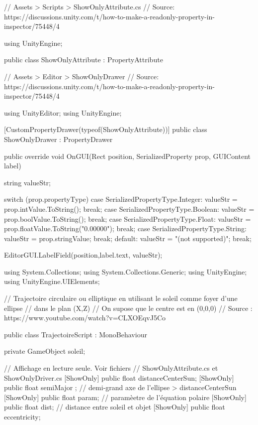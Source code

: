 \documentclass[a4paper,10pt]{article}
\newenvironment{solution}%
{\begin{tcolorbox}[breakable,colback=red!5!white,colframe=red!75!black,title=Solution]}%
{\end{tcolorbox}}
\newenvironment{boxcode}%
{\begin{tcolorbox}[breakable,colback=gray!5!white,colframe=black]}%
	{\end{tcolorbox}}
\begin{document}
\begin{solution}
\begin{boxcode}
	\begin{csharpsansbord}
// Assets > Scripts > ShowOnlyAttribute.cs
// Source: https://discussions.unity.com/t/how-to-make-a-readonly-property-in-inspector/75448/4
	
using UnityEngine;

public class ShowOnlyAttribute : PropertyAttribute
{
	
}
	\end{csharpsansbord}
\end{boxcode}


\begin{boxcode}
	\begin{csharpsansbord}
// Assets > Editor > ShowOnlyDrawer
// Source: https://discussions.unity.com/t/how-to-make-a-readonly-property-in-inspector/75448/4

using UnityEditor;
using UnityEngine;

[CustomPropertyDrawer(typeof(ShowOnlyAttribute))]
public class ShowOnlyDrawer : PropertyDrawer
{
	public override void OnGUI(Rect position, SerializedProperty prop, GUIContent label)
	{
		string valueStr;
		
		switch (prop.propertyType)
		{
			case SerializedPropertyType.Integer:
			valueStr = prop.intValue.ToString();
			break;
			case SerializedPropertyType.Boolean:
			valueStr = prop.boolValue.ToString();
			break;
			case SerializedPropertyType.Float:
			valueStr = prop.floatValue.ToString("0.00000");
			break;
			case SerializedPropertyType.String:
			valueStr = prop.stringValue;
			break;
			default:
			valueStr = "(not supported)";
			break;
		}
		
		EditorGUI.LabelField(position,label.text, valueStr);
	}
}	
	\end{csharpsansbord}
\end{boxcode}


\begin{boxcode}
	\begin{csharpsansbord}
using System.Collections;
using System.Collections.Generic;
using UnityEngine;
using UnityEngine.UIElements;

// Trajectoire circulaire ou elliptique en utilisant le soleil comme foyer d'une ellipse
//  dans le plan (X,Z)
// On supose que le centre est en (0,0,0)
// Source : https://www.youtube.com/watch?v=CLXOEqvJ5Co

public class TrajectoireScript : MonoBehaviour
{
	private GameObject soleil;
	
	// Affichage en lecture seule. Voir fichiers
	// ShowOnlyAttribute.cs et ShowOnlyDriver.cs
	[ShowOnly] public float distanceCenterSun;
	[ShowOnly] public float semiMajor ; // demi-grand axe de l'ellipse > distanceCenterSun
	[ShowOnly] public float param; // paramèetre de l'équation polaire
	[ShowOnly] public float dist; // distance entre soleil et objet
	[ShowOnly] public float eccentricity;
	
}
\end{csharpsansbord}
\end{boxcode}
\end{solution}
\end{document}
